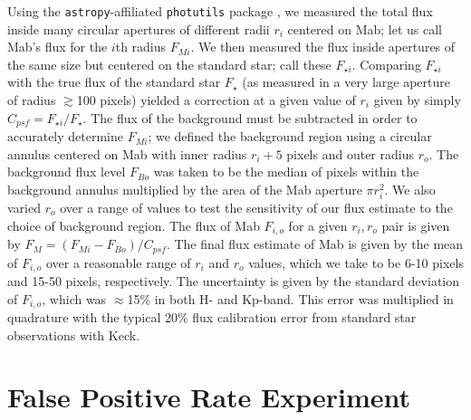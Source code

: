 \documentclass[preprint]{aastex631}
\begin{document}
Using the \texttt{astropy}-affiliated \texttt{photutils} package \citep{photutils140}, we measured the total flux inside many circular apertures of different radii $r_i$ centered on Mab; let us call Mab's flux for the $i$th radius $F_{M i}$. We then measured the flux inside apertures of the same size but centered on the standard star; call these $F_{\star i}$. Comparing $F_{\star i}$ with the true flux of the standard star $F_\star$ (as measured in a very large aperture of radius $\gtrsim$100 pixels) yielded a correction at a given value of $r_{i}$ given by simply $C_{psf} = F_{\star i}/F_\star$. The flux of the background must be subtracted in order to accurately determine $F_{M i}$; we defined the background region using a circular annulus centered on Mab with inner radius $r_i + 5$ pixels and outer radius $r_o$. The background flux level $F_{B o}$ was taken to be the median of pixels within the background annulus multiplied by the area of the Mab aperture $\pi r_i^2$. We also varied $r_o$ over a range of values to test the sensitivity of our flux estimate to the choice of background region. The flux of Mab $F_{i,o}$ for a given $r_i, r_o$ pair is given by $F_M = (F_{M i} - F_{B o}) / C_{psf}$.
The final flux estimate of Mab is given by the mean of $F_{i,o}$ over a reasonable range of $r_i$ and $r_o$ values, which we take to be 6-10 pixels and 15-50 pixels, respectively. The uncertainty is given by the standard deviation of $F_{i,o}$, which was $\approx$15\% in both H- and Kp-band. This error was multiplied in quadrature with the typical 20\% flux calibration error from standard star observations with Keck.



\section{False Positive Rate Experiment}
\label{s:falsepositives}
\end{document}
